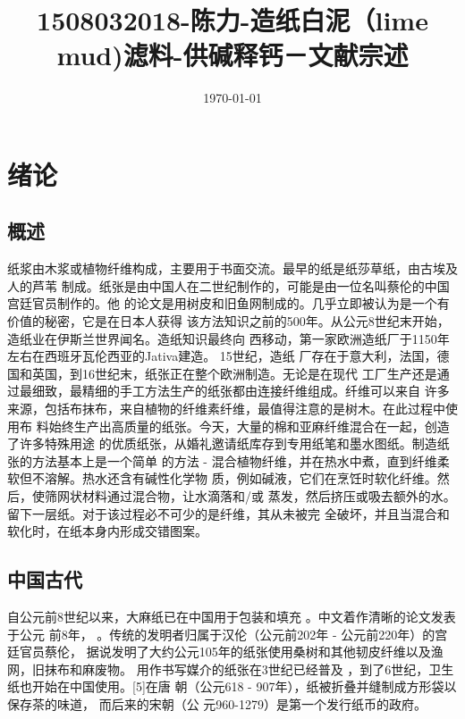 \documentclass[11pt]{article}
\date{\today}
\title{1508032018-陈力-造纸白泥（lime mud)滤料-供碱释钙－文献宗述}
\begin{document}
\maketitle
\tableofcontents



\section{绪论}
\label{sec:orgbfc1aa0}

\subsection{概述}
\label{sec:org2e0285b}
纸浆由木浆或植物纤维构成，主要用于书面交流。最早的纸是纸莎草纸，由古埃及人的芦苇
制成。纸张是由中国人在二世纪制作的，可能是由一位名叫蔡伦的中国宫廷官员制作的。他
的论文是用树皮和旧鱼网制成的。几乎立即被认为是一个有价值的秘密，它是在日本人获得
该方法知识之前的500年。从公元8世纪末开始，造纸业在伊斯兰世界闻名。造纸知识最终向
西移动，第一家欧洲造纸厂于1150年左右在西班牙瓦伦西亚的Jativa建造。 15世纪，造纸
厂存在于意大利，法国，德国和英国，到16世纪末，纸张正在整个欧洲制造。无论是在现代
工厂生产还是通过最细致，最精细的手工方法生产的纸张都由连接纤维组成。纤维可以来自
许多来源，包括布抹布，来自植物的纤维素纤维，最值得注意的是树木。在此过程中使用布
料始终生产出高质量的纸张。今天，大量的棉和亚麻纤维混合在一起，创造了许多特殊用途
的优质纸张，从婚礼邀请纸库存到专用纸笔和墨水图纸。制造纸张的方法基本上是一个简单
的方法 - 混合植物纤维，并在热水中煮，直到纤维柔软但不溶解。热水还含有碱性化学物
质，例如碱液，它们在烹饪时软化纤维。然后，使筛网状材料通过混合物，让水滴落和/或
蒸发，然后挤压或吸去额外的水。留下一层纸。对于该过程必不可少的是纤维，其从未被完
全破坏，并且当混合和软化时，在纸本身内形成交错图案。


\subsection{中国古代}
\label{sec:orgbfccf4f}
自公元前8世纪以来，大麻纸已在中国用于包装和填充
\cite{Needham_Joseph_1986_Science_and_Civilization_in_China} 。中文着作清晰的论文发表于公元
前8年，\cite{World_Archaeological_Congress_eNewsletter} 。传统的发明者归属于汉伦（公元前202年 - 公元前220年）的宫廷官员蔡伦，
据说发明了大约公元105年的纸张使用桑树和其他韧皮纤维以及渔网，旧抹布和麻废物。\cite{In_Encyclopædia_Britannica}
用作书写媒介的纸张在3世纪已经普及\cite{Science_and_Civilization_in_China} ，到了6世纪，卫生纸也开始在中国使用。[5]在唐
朝（公元618 - 907年），纸被折叠并缝制成方形袋以保存茶的味道，\cite{Needham_Joseph_1986_Science_and_Civilization_in_China} 而后来的宋朝（公
元960-1279）是第一个发行纸币的政府。
\end{document}
